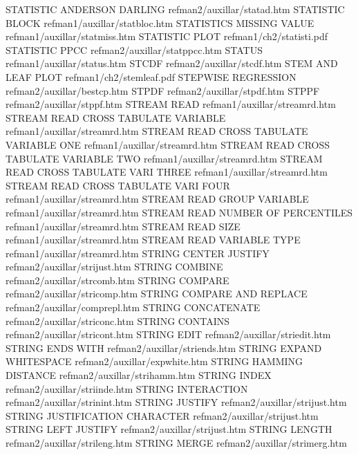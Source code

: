 STATISTIC ANDERSON DARLING              refman2/auxillar/statad.htm
STATISTIC BLOCK                         refman1/auxillar/statbloc.htm
STATISTICS MISSING VALUE                refman1/auxillar/statmiss.htm
STATISTIC PLOT                          refman1/ch2/statisti.pdf
STATISTIC PPCC                          refman2/auxillar/statppcc.htm
STATUS                                  refman1/auxillar/status.htm
STCDF                                   refman2/auxillar/stcdf.htm
STEM AND LEAF PLOT                      refman1/ch2/stemleaf.pdf
STEPWISE REGRESSION                     refman2/auxillar/bestcp.htm
STPDF                                   refman2/auxillar/stpdf.htm
STPPF                                   refman2/auxillar/stppf.htm
STREAM READ                             refman1/auxillar/streamrd.htm
STREAM READ CROSS TABULATE VARIABLE     refman1/auxillar/streamrd.htm
STREAM READ CROSS TABULATE VARIABLE ONE refman1/auxillar/streamrd.htm
STREAM READ CROSS TABULATE VARIABLE TWO refman1/auxillar/streamrd.htm
STREAM READ CROSS TABULATE VARI THREE   refman1/auxillar/streamrd.htm
STREAM READ CROSS TABULATE VARI FOUR    refman1/auxillar/streamrd.htm
STREAM READ GROUP VARIABLE              refman1/auxillar/streamrd.htm
STREAM READ NUMBER OF PERCENTILES       refman1/auxillar/streamrd.htm
STREAM READ SIZE                        refman1/auxillar/streamrd.htm
STREAM READ VARIABLE TYPE               refman1/auxillar/streamrd.htm
STRING CENTER JUSTIFY                   refman2/auxillar/strijust.htm
STRING COMBINE                          refman2/auxillar/strcomb.htm
STRING COMPARE                          refman2/auxillar/stricomp.htm
STRING COMPARE AND REPLACE              refman2/auxillar/comprepl.htm
STRING CONCATENATE                      refman2/auxillar/striconc.htm
STRING CONTAINS                         refman2/auxillar/stricont.htm
STRING EDIT                             refman2/auxillar/striedit.htm
STRING ENDS WITH                        refman2/auxillar/striends.htm
STRING EXPAND WHITESPACE                refman2/auxillar/expwhite.htm
STRING HAMMING DISTANCE                 refman2/auxillar/strihamm.htm
STRING INDEX                            refman2/auxillar/striinde.htm
STRING INTERACTION                      refman2/auxillar/strinint.htm
STRING JUSTIFY                          refman2/auxillar/strijust.htm
STRING JUSTIFICATION CHARACTER          refman2/auxillar/strijust.htm
STRING LEFT JUSTIFY                     refman2/auxillar/strijust.htm
STRING LENGTH                           refman2/auxillar/strileng.htm
STRING MERGE                            refman2/auxillar/strimerg.htm
